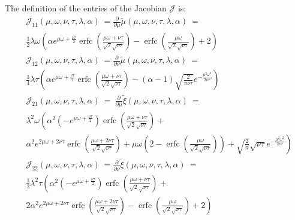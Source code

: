\documentclass{article}
\newcommand\munn{{\tilde \mu}}
\newcommand\xinn{{\tilde \xi}}
\DeclareMathOperator{\erfc}{erfc}
\begin{document}
The definition of the entries of the Jacobian $\mathcal J$ is: 
\begin{align}
\label{eq:JacobianEntries}
& {\mathcal J}_{11}(\mu,\omega,\nu,\tau,\lambda ,\alpha ) \
= \frac{\partial }{\partial \mu} \munn(\mu,\omega,\nu,\tau,\lambda ,\alpha ) \ = \\ \nonumber &\frac{1}{2} \lambda  \omega 
\left(\alpha  e^{\mu \omega+\frac{\nu \tau}{2}} \erfc \left(\frac{\mu \omega+\nu \tau}{\sqrt{2} \sqrt{\nu \tau}}\right)
-\erfc \left(\frac{\mu \omega}{\sqrt{2} \sqrt{\nu \tau}}\right)+2\right)\\
&{\mathcal J}_{12}(\mu,\omega,\nu,\tau,\lambda ,\alpha ) \ 
= \frac{\partial }{\partial \nu} \munn(\mu,\omega,\nu,\tau,\lambda ,\alpha ) \  = \\ \nonumber &\frac{1}{4} \lambda  \tau \left(\alpha
  e^{\mu \omega+\frac{\nu \tau}{2}}
  \erfc \left(\frac{\mu \omega+\nu \tau}{\sqrt{2}
      \sqrt{\nu \tau}}\right)-(\alpha -1)
  \sqrt{\frac{2}{\pi  \nu \tau}} e^{-\frac{\mu^2
      \omega^2}{2 \nu \tau}}\right)\\
&{\mathcal J}_{21}(\mu,\omega,\nu,\tau,\lambda ,\alpha ) \ 
= \ \frac{\partial }{\partial \mu } \xinn(\mu,\omega,\nu,\tau,\lambda ,\alpha )\ = \\ \nonumber &\lambda ^2 \omega \left(\alpha ^2 \left(-e^{\mu
      \omega+\frac{\nu \tau}{2}}\right)
  \erfc \left(\frac{\mu \omega+\nu \tau}{\sqrt{2}
      \sqrt{\nu \tau}}\right)+\right. \\ \nonumber
&\left. \alpha ^2 e^{2 \mu \omega+2
    \nu \tau} \erfc \left(\frac{\mu \omega+2
      \nu \tau}{\sqrt{2} \sqrt{\nu
        \tau}}\right)+\mu \omega
  \left(2-\erfc \left(\frac{\mu \omega}{\sqrt{2} \sqrt{\nu
          \tau}}\right)\right)+\sqrt{\frac{2}{\pi }}
  \sqrt{\nu \tau} e^{-\frac{\mu^2 \omega^2}{2 \nu
      \tau}}\right)\\
&{\mathcal J}_{22}(\mu,\omega,\nu,\tau,\lambda ,\alpha ) \ 
= \frac{\partial }{\partial \nu } \xinn(\mu,\omega,\nu,\tau,\lambda ,\alpha )\ 
= \\ \nonumber &\frac{1}{2} \lambda ^2 \tau \left(\alpha ^2
  \left(-e^{\mu \omega+\frac{\nu \tau}{2}}\right)
  \erfc \left(\frac{\mu \omega+\nu \tau}{\sqrt{2}
      \sqrt{\nu \tau}}\right)+\right. \\ \nonumber
&\left. 2 \alpha ^2 e^{2 \mu
    \omega+2 \nu \tau} \erfc \left(\frac{\mu \omega+2
      \nu \tau}{\sqrt{2} \sqrt{\nu
        \tau}}\right)-\erfc \left(\frac{\mu
      \omega}{\sqrt{2} \sqrt{\nu \tau}}\right)+2\right)
\end{align}
\end{document}
